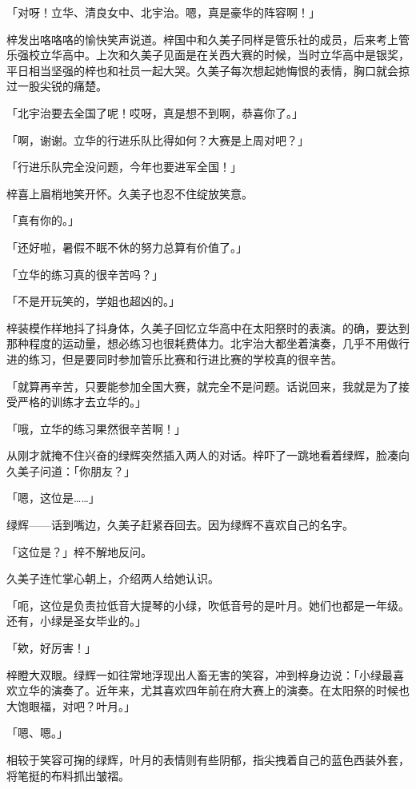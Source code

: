 \documentclass[UTF8]{ctexart}
\begin{document}
    「对呀！立华、清良女中、北宇治。嗯，真是豪华的阵容啊！」 

    梓发出咯咯咯的愉快笑声说道。梓国中和久美子同样是管乐社的成员，后来考上管乐强校立华高中。上次和久美子见面是在关西大赛的时候，当时立华高中是银奖，平日相当坚强的梓也和社员一起大哭。久美子每次想起她悔恨的表情，胸口就会掠过一股尖锐的痛楚。 

    「北宇治要去全国了呢！哎呀，真是想不到啊，恭喜你了。」 

    「啊，谢谢。立华的行进乐队比得如何？大赛是上周对吧？」 

    「行进乐队完全没问题，今年也要进军全国！」 

    梓喜上眉梢地笑开怀。久美子也忍不住绽放笑意。 

    「真有你的。」 

    「还好啦，暑假不眠不休的努力总算有价值了。」 

    「立华的练习真的很辛苦吗？」 

    「不是开玩笑的，学姐也超凶的。」 

    梓装模作样地抖了抖身体，久美子回忆立华高中在太阳祭时的表演。的确，要达到那种程度的运动量，想必练习也很耗费体力。北宇治大都坐着演奏，几乎不用做行进的练习，但是要同时参加管乐比赛和行进比赛的学校真的很辛苦。 

    「就算再辛苦，只要能参加全国大赛，就完全不是问题。话说回来，我就是为了接受严格的训练才去立华的。」 

    「哦，立华的练习果然很辛苦啊！」 

    从刚才就掩不住兴奋的绿辉突然插入两人的对话。梓吓了一跳地看着绿辉，脸凑向久美子问道：「你朋友？」 

    「嗯，这位是……」 

    绿辉——话到嘴边，久美子赶紧吞回去。因为绿辉不喜欢自己的名字。 

    「这位是？」梓不解地反问。 

    久美子连忙掌心朝上，介绍两人给她认识。 

    「呃，这位是负责拉低音大提琴的小绿，吹低音号的是叶月。她们也都是一年级。还有，小绿是圣女毕业的。」 

    「欸，好厉害！」 

    梓瞪大双眼。绿辉一如往常地浮现出人畜无害的笑容，冲到梓身边说：「小绿最喜欢立华的演奏了。近年来，尤其喜欢四年前在府大赛上的演奏。在太阳祭的时候也大饱眼福，对吧？叶月。」 

    「嗯、嗯。」 

    相较于笑容可掬的绿辉，叶月的表情则有些阴郁，指尖拽着自己的蓝色西装外套，将笔挺的布料抓出皱褶。 
\end{document}
